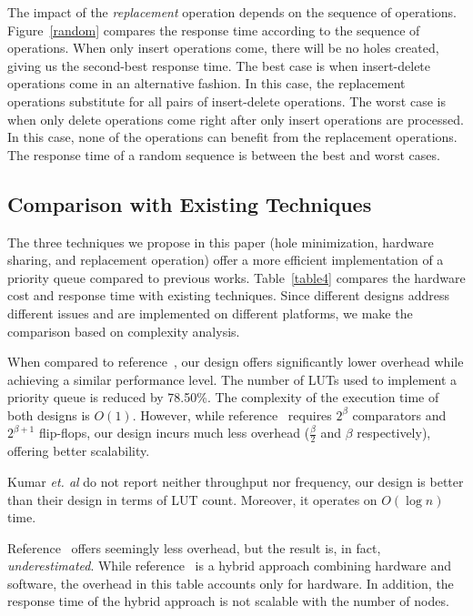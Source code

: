 The impact of the {\it replacement} operation depends on the sequence of operations.
Figure~\ref{random} compares the response time according to the sequence of operations.
When only insert operations come, there will be no holes created, giving us the second-best response time.
The best case is when insert-delete operations come in an alternative fashion.
In this case, the replacement operations substitute for all pairs of insert-delete operations.
The worst case is when only delete operations come right after only insert operations are processed.
In this case, none of the operations can benefit from the replacement operations.
The response time of a random sequence is between the best and worst cases.

\subsection{Comparison with Existing Techniques}

The three techniques we propose in this paper (hole minimization, hardware sharing, and replacement operation) offer a more efficient implementation of a priority queue compared to previous works.
Table~\ref{table4} compares the hardware cost and response time with existing techniques.
Since different designs address different issues and are implemented on different platforms, we make the comparison based on complexity analysis.

When compared to reference~\cite{hw8}, our design offers significantly lower overhead while achieving a similar performance level.
The number of LUTs used to implement a priority queue is reduced by 78.50\%.
The complexity of the execution time of both designs is $O(1)$.
However, while reference~\cite{hw8} requires $2^\beta$ comparators and $2^{\beta+1}$ flip-flops, our design incurs much less overhead ($\frac{\beta}{2}$ and $\beta$ respectively), offering better scalability.

Kumar {\it et. al} \cite{hwsw1} do not report neither throughput nor frequency, our design is better than their design in terms of LUT count. Moreover, it operates on $O(\log n)$ time.

Reference~\cite{hw11} offers seemingly less overhead, but the result is, in fact, {\it underestimated}.
While reference~\cite{hw11} is a hybrid approach combining hardware and software, the overhead in this table accounts only for hardware.
In addition, the response time of the hybrid approach is not scalable with the number of nodes.

